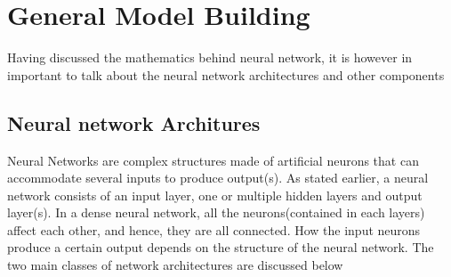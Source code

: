 \documentclass[a4paper,11pt,oneside]{book}
\begin{document}
 \section{General Model Building}
 Having discussed the mathematics behind neural network, it is however in important to talk about the neural network architectures and other components
 \subsection{Neural network Architures}
 Neural Networks are complex structures made of artificial neurons that can accommodate several inputs to produce output(s). As stated earlier, a neural network consists of an input layer, one or multiple hidden layers and output layer(s). In a dense neural network, all the neurons(contained in each layers) affect each other, and hence, they are all connected. How the input neurons produce a certain output depends
 on the structure of the neural network. The two main classes of network architectures are discussed below
\end{document}
